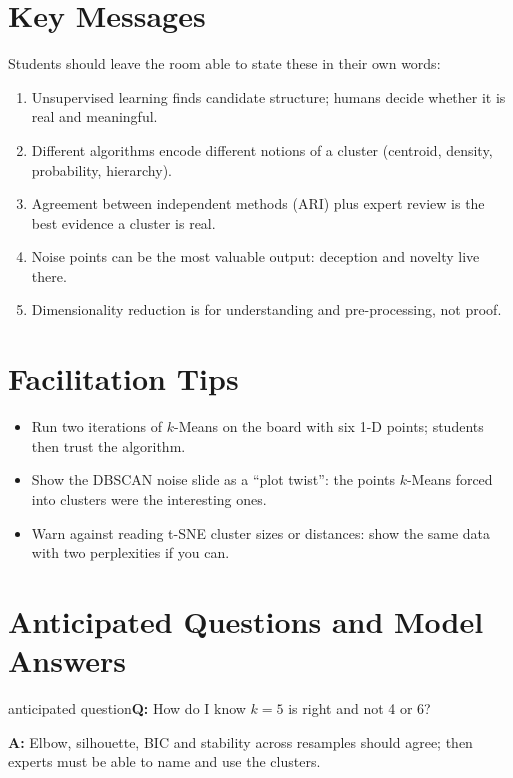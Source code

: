 \documentclass[11pt]{article}
\begin{document}
\section{Key Messages}Students should leave the room able to state these in their own words:\begin{keypoint}\begin{enumerate}\item Unsupervised learning finds candidate structure; humans decide whether it is real and meaningful.\item Different algorithms encode different notions of a cluster (centroid, density, probability, hierarchy).\item Agreement between independent methods (ARI) plus expert review is the best evidence a cluster is real.\item Noise points can be the most valuable output: deception and novelty live there.\item Dimensionality reduction is for understanding and pre-processing, not proof.\end{enumerate}\end{keypoint}

\section{Facilitation Tips}\begin{itemize}\item Run two iterations of $k$-Means on the board with six 1-D points; students then trust the algorithm.\item Show the DBSCAN noise slide as a ``plot twist'': the points $k$-Means forced into clusters were the interesting ones.\item Warn against reading t-SNE cluster sizes or distances: show the same data with two perplexities if you can.\end{itemize}

\section{Anticipated Questions and Model Answers}

\begin{question}{anticipated question}\textbf{Q:} How do I know $k=5$ is right and not 4 or 6?\par\smallskip\textbf{A:} Elbow, silhouette, BIC and stability across resamples should agree; then experts must be able to name and use the clusters.\end{question}
\end{document}
